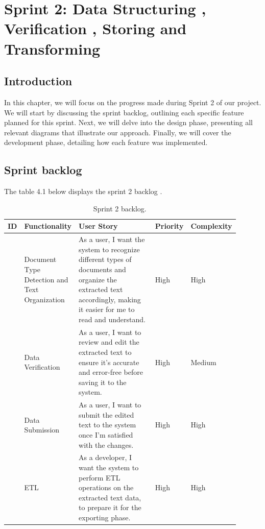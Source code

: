 %
\chapter{Sprint 2: Data Structuring , Verification , Storing and Transforming}
\label{ch::chapter5}

\section{Introduction}

In this chapter, we will focus on the progress made during Sprint 2 of our project. We will start by discussing the sprint backlog, outlining each specific feature planned for this sprint. Next, we will delve into the design phase, presenting all relevant diagrams that illustrate our approach. Finally, we will cover the development phase, detailing how each feature was implemented.

\section{Sprint backlog}
The table 4.1 below displays the sprint 2 backlog .
\begin{table}[!htpb]
    \caption{Sprint 2 backlog.}
    \centering
    \begin{tabular}{|>{\centering\arraybackslash}m{0.05\linewidth}|>{\centering\arraybackslash}m{0.15\linewidth}|>{\centering\arraybackslash}m{0.45\linewidth}|>{\centering\arraybackslash}m{0.1\linewidth}|>{\centering\arraybackslash}m{0.15\linewidth}|} \hline 
    \textbf{ID} & \textbf{Functionality} & \textbf{User Story} & \textbf{Priority} & \textbf{Complexity} \\ \hline
         1 & Document Type Detection and Text Organization & As a user, I want the system to recognize different types of documents and organize the extracted text accordingly, making it easier for me to read and understand. & High & High\\ \hline
         2 & Data Verification & As a user, I want to review and edit the extracted text to ensure it's accurate and error-free before saving it to the system. & High & Medium\\ \hline
         3 & Data Submission & As a user, I want to submit the edited text to the system once I'm satisfied with the changes. & High & High\\ \hline
         4 & ETL & As a developer, I want the system to perform ETL operations on the extracted text data, to prepare it for the exporting phase. & High & High\\ \hline
    \end{tabular}
    
    \label{tab:sprint2_backlog}
\end{table}



